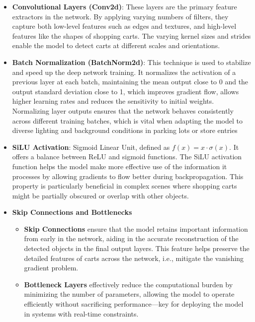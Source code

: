 \documentclass[10pt,twocolumn,letterpaper]{article}
\begin{document}
\begin{itemize}
    \item \textbf{Convolutional Layers (Conv2d)}: These layers are the primary feature extractors in the network. By applying varying numbers of filters, they capture both low-level features such as edges and textures, and high-level features like the shapes of shopping carts. The varying kernel sizes and strides enable the model to detect carts at different scales and orientations.

    \item \textbf{Batch Normalization (BatchNorm2d)}: This technique is used to stabilize and speed up the deep network training. It normalizes the activation of a previous layer at each batch, maintaining the mean output close to 0 and the output standard deviation close to 1, which improves gradient flow, allows higher learning rates and reduces the sensitivity to initial weights. Normalizing layer outputs ensures that the network behaves consistently across different training batches, which is vital when adapting the model to diverse lighting and background conditions in parking lots or store entries

    \item \textbf{SiLU Activation}: Sigmoid Linear Unit, defined as $f(x) = x \cdot \sigma(x)$. It offers a balance between ReLU and sigmoid functions. The SiLU activation function helps the model make more effective use of the information it processes by allowing gradients to flow better during backpropagation. This property is particularly beneficial in complex scenes where shopping carts might be partially obscured or overlap with other objects.

    \item \textbf{Skip Connections and Bottlenecks}
    \begin{itemize}
        \item \textbf{Skip Connections} ensure that the model retains important information from early in the network, aiding in the accurate reconstruction of the detected objects in the final output layers. This feature helps preserve the detailed features of carts across the network, i.e., mitigate the vanishing gradient problem.
        \item \textbf{Bottleneck Layers} effectively reduce the computational burden by minimizing the number of parameters, allowing the model to operate efficiently without sacrificing performance—key for deploying the model in systems with real-time constraints.
    \end{itemize}


\end{itemize}
\end{document}
